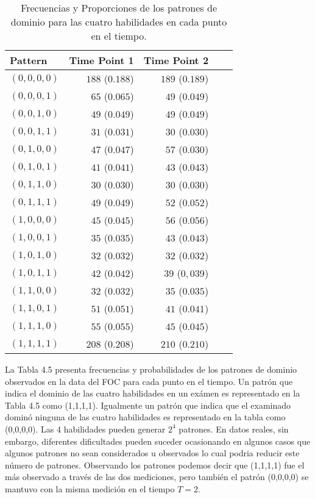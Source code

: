 \begin{table}[H]
	\centering
	\caption{Frecuencias y Proporciones de los patrones de dominio para las cuatro habilidades en cada punto en el tiempo.}
	\begin{tabular}{lrrrr}
		\hline
		Pattern & \multicolumn{1}{c}{Time Point 1} & \multicolumn{1}{c}{Time Point 2} \\
		\hline
		$(0, 0, 0, 0)$ 	& $188$ ($0.188$) & $189$ ($0.189$) \\
		$(0, 0, 0, 1)$  & $65$ ($0.065$) & $49$ ($0.049$) \\
		$(0, 0, 1, 0)$  & $49$ ($0.049$) & $ 49$ ($0.049$) \\
		$(0, 0, 1, 1)$  & $31$ ($0.031$) & $30$ ($0.030$) \\
		$(0, 1, 0, 0)$ 	& $47$ ($0.047$) & $57$ ($0.030$) \\
		$(0, 1, 0, 1)$  & $41$ ($0.041$) & $43$ ($0.043$) \\
		$(0, 1, 1, 0)$  & $30$ ($0.030$) & $ 30$ ($0.030$) \\
		$(0, 1, 1, 1)$  & $49$ ($0.049$) & $52$ ($0.052$) \\
		$(1, 0, 0, 0)$ 	& $45$ ($0.045$) & $56$ ($0.056$) \\
		$(1, 0, 0, 1)$  & $35$ ($0.035$) & $43$ ($0.043$) \\
		$(1, 0, 1, 0)$  & $32$ ($0.032$) & $ 32$ ($ 0.032$)\\
		$(1, 0, 1, 1)$  & $42$ ($0.042$) & $39$ ($0,039$) \\
		$(1, 1, 0, 0)$  & $32$ ($0.032$) & $35$ ($0.035$)\\
		$(1, 1, 0, 1)$  & $51$ ($0.051$) & $ 41$ ($0.041$)\\
		$(1, 1, 1, 0)$  & $55$ ($0.055$) & $45$ ($0.045$)\\
$(1, 1, 1, 1)$  & $208$ ($0.208$) & $210$ ($0.210$) \\
		\hline
	\end{tabular}
\end{table}
La Tabla 4.5 presenta frecuencias y probabilidades de los patrones de dominio observados en la data del FOC para cada punto en el tiempo. Un patrón que indica el dominio de las cuatro habilidades en un exámen es representado en la Tabla 4.5 como (1,1,1,1). Igualmente un patrón que indica que el examinado dominó ninguna de las cuatro habilidades es representado en la tabla como (0,0,0,0). Las 4 habilidades pueden generar $2^4$ patrones. En datos reales, sin embargo, diferentes dificultades pueden suceder ocasionando en algunos casos que algunos patrones no sean considerados u observados lo cual podria reducir este número de patrones.
Observando los patrones podemos decir que (1,1,1,1) fue el más observado a través de las dos mediciones, pero también el patrón (0,0,0,0) se mantuvo con la misma medición en el tiempo $T=2$.     


